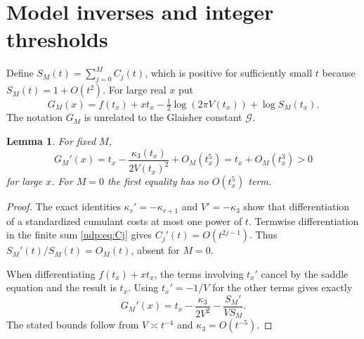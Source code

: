 \documentclass[11pt]{article}
\newtheorem{lemma}[theorem]{Lemma}
\theoremstyle{remark}\newtheorem{remark}[theorem]{Remark}
\newcommand{\Gla}{\mathcal G}
\numberwithin{equation}{section}
\begin{document}
\section{Model inverses and integer thresholds}\label{udp:sec:inverse}
Define $S_M(t)=\sum_{j=0}^M C_j(t)$, which is positive for sufficiently small $t$ because $S_M(t)=1+O(t^2)$. For large real $x$ put
\begin{equation}\label{udp:eq:GM}
 G_M(x)=f(t_x)+xt_x-\tfrac12\log(2\pi V(t_x))+\log S_M(t_x).
\end{equation}
The notation $G_M$ is unrelated to the Glaisher constant $\Gla$.

\begin{lemma}\label{udp:lem:GMderivative}
For fixed $M$,
\begin{equation}\label{udp:eq:GMprime}
 G_M'(x)=t_x-\frac{\kappa_3(t_x)}{2V(t_x)^2}+O_M(t_x^5)
 =t_x+O_M(t_x^3)>0
\end{equation}
for large $x$. For $M=0$ the first equality has no $O(t_x^5)$ term.
\end{lemma}
\begin{proof}
The exact identities $\kappa_r'=-\kappa_{r+1}$ and $V'=-\kappa_3$ show that differentiation of a standardized cumulant costs at most one power of $t$. Termwise differentiation in the finite sum \eqref{udp:eq:Cj} gives $C_j'(t)=O(t^{2j-1})$. Thus $S_M'(t)/S_M(t)=O_M(t)$, absent for $M=0$.

When differentiating $f(t_x)+xt_x$, the terms involving $t_x'$ cancel by the saddle equation and the result is $t_x$. Using $t_x'=-1/V$ for the other terms gives exactly
\[
 G_M'(x)=t_x-\frac{\kappa_3}{2V^2}-\frac{S_M'}{VS_M}.
\]
The stated bounds follow from $V\asymp t^{-4}$ and $\kappa_3=O(t^{-5})$.
\end{proof}
\end{document}
